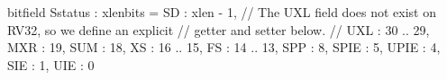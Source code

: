 bitfield Sstatus : xlenbits = {
  SD   : xlen - 1,
  // The UXL field does not exist on RV32, so we define an explicit
  // getter and setter below.
  // UXL  : 30 .. 29,
  MXR  : 19,
  SUM  : 18,
  XS   : 16 .. 15,
  FS   : 14 .. 13,
  SPP  : 8,
  SPIE : 5,
  UPIE : 4,
  SIE  : 1,
  UIE  : 0
}
